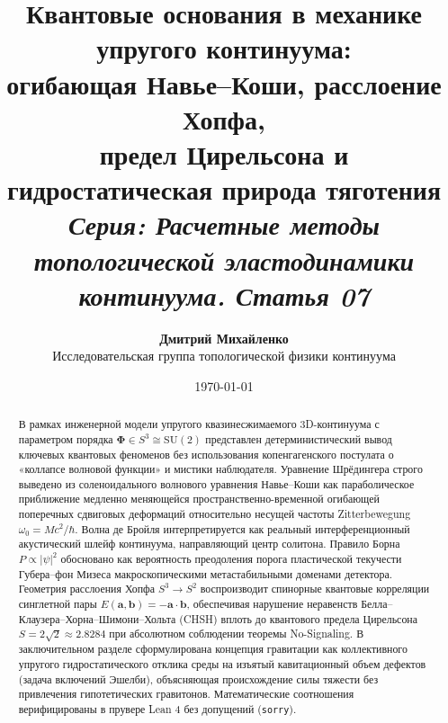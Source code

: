 \documentclass[11pt,a4paper]{article}
\theoremstyle{definition}
\theoremstyle{remark}
\begin{document}
\title{\textbf{\Large Квантовые основания в механике упругого континуума:}\\
\large огибающая Навье--Коши, расслоение Хопфа,\\ предел Цирельсона и гидростатическая природа тяготения\\[2mm]
\normalsize \textit{Серия: Расчетные методы топологической эластодинамики континуума. Статья 07}}

\author{\textbf{Дмитрий Михайленко}\\[1mm]
\small Исследовательская группа топологической физики континуума}

\date{\today}

\maketitle

\begin{abstract}
\noindent В рамках инженерной модели упругого квазинесжимаемого 3D-континуума с параметром порядка $\boldsymbol{\Phi} \in S^3 \cong \mathrm{SU}(2)$ представлен детерминистический вывод ключевых квантовых феноменов без использования копенгагенского постулата о «коллапсе волновой функции» и мистики наблюдателя. Уравнение Шрёдингера строго выведено из соленоидального волнового уравнения Навье--Коши как параболическое приближение медленно меняющейся пространственно-временной огибающей поперечных сдвиговых деформаций относительно несущей частоты Zitterbewegung $\omega_0 = M c^2 / \hbar$. Волна де Бройля интерпретируется как реальный интерференционный акустический шлейф континуума, направляющий центр солитона. Правило Борна $P \propto |\psi|^2$ обосновано как вероятность преодоления порога пластической текучести Губера--фон Мизеса макроскопическими метастабильными доменами детектора. Геометрия расслоения Хопфа $S^3 \to S^2$ воспроизводит спинорные квантовые корреляции синглетной пары $E(\mathbf{a},\mathbf{b}) = -\mathbf{a}\cdot\mathbf{b}$, обеспечивая нарушение неравенств Белла--Клаузера--Хорна--Шимони--Хольта (CHSH) вплоть до квантового предела Цирельсона $S = 2\sqrt{2} \approx 2.8284$ при абсолютном соблюдении теоремы No-Signaling. В заключительном разделе сформулирована концепция гравитации как коллективного упругого гидростатического отклика среды на изъятый кавитационный объем дефектов (задача включений Эшелби), объясняющая происхождение силы тяжести без привлечения гипотетических гравитонов. Математические соотношения верифицированы в прувере Lean 4 без допущений (\texttt{sorry}).
\end{abstract}
\end{document}
